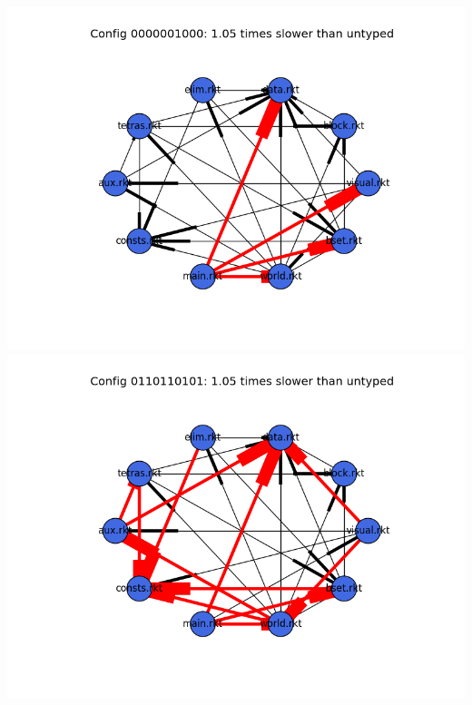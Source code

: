 \documentclass{article}
\begin{document}
\begin{itemize}
\includegraphics[width=\textwidth]{tetris-module-graph-0000001000.png}
\includegraphics[width=\textwidth]{tetris-module-graph-0110110101.png}
\end{itemize}
\end{document}
